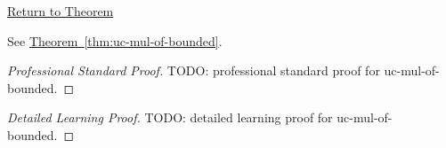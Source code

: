\newpage
{}
\label{prf:uc-mul-of-bounded}

\begin{remark*}[Return]
\hyperref[thm:uc-mul-of-bounded]{Return to Theorem}
\end{remark*}

\begin{theorem*}
See \hyperref[thm:uc-mul-of-bounded]{Theorem~\ref*{thm:uc-mul-of-bounded}}.
\end{theorem*}

\begin{proof}[Professional Standard Proof]
\LRAProofBodyStart
TODO: professional standard proof for uc-mul-of-bounded.
\end{proof}

\begin{proof}[Detailed Learning Proof]
\LRAProofBodyStart
TODO: detailed learning proof for uc-mul-of-bounded.
\end{proof}

\begin{remark*}
\end{remark*}

\begin{dependencies}
\NoLocalDependencies
\end{dependencies}

\clearpage
